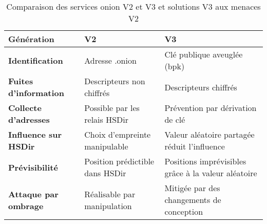 \begin{table}[h!]
    \centering
    \begin{tabularx}{\textwidth}{
        >{\raggedright\arraybackslash}p{4cm}
        >{\raggedright\arraybackslash}X
        >{\raggedright\arraybackslash}X}
    \toprule
    \rowcolor[HTML]{EFEFEF}
    \textbf{Génération}             & \textbf{V2}                       & \textbf{V3} \\ 
    \midrule
    \textbf{Identification}         & Adresse .onion                    & Clé publique aveuglée (bpk) \\
    \textbf{Fuites d'information}   & Descripteurs non chiffrés         & Descripteurs chiffrés \\
    \textbf{Collecte d'adresses}    & Possible par les relais HSDir     & Prévention par dérivation de clé \\
    \textbf{Influence sur HSDir}    & Choix d'empreinte manipulable     & Valeur aléatoire partagée réduit l'influence \\
    \textbf{Prévisibilité}          & Position prédictible dans HSDir   & Positions imprévisibles grâce à la valeur aléatoire \\
    \textbf{Attaque par ombrage}    & Réalisable par manipulation       & Mitigée par des changements de conception \\
    \bottomrule
    \end{tabularx}
    \caption{Comparaison des services onion V2 et V3 et solutions V3 aux menaces V2}
    \label{table:1}
\end{table}